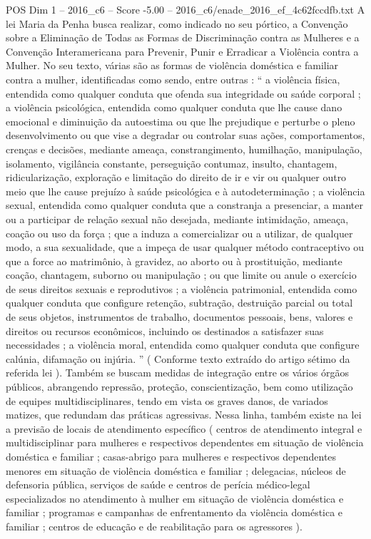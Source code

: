 \begin{textsample}{POS Dim 1 – 2016\_c6 – Score -5.00 – 2016\_c6/enade\_2016\_ef\_4c62fccdfb.txt}
A lei Maria da Penha busca realizar, como indicado no seu pórtico, a Convenção sobre a Eliminação de Todas as Formas de Discriminação contra as Mulheres e a Convenção Interamericana para Prevenir, Punir e Erradicar a Violência contra a Mulher.
No seu texto, várias são as formas de violência doméstica e familiar contra a mulher, identificadas como sendo, entre outras : “ a violência física, entendida como qualquer conduta que ofenda sua integridade ou saúde corporal ; a violência psicológica, entendida como qualquer conduta que lhe cause dano emocional e diminuição da autoestima ou que lhe prejudique e perturbe o pleno desenvolvimento ou que vise a degradar ou controlar suas ações, comportamentos, crenças e decisões, mediante ameaça, constrangimento, humilhação, manipulação, isolamento, vigilância constante, perseguição contumaz, insulto, chantagem, ridicularização, exploração e limitação do direito de ir e vir ou qualquer outro meio que lhe cause prejuízo à saúde psicológica e à autodeterminação ; a violência sexual, entendida como qualquer conduta que a constranja a presenciar, a manter ou a participar de relação sexual não desejada, mediante intimidação, ameaça, coação ou uso da força ; que a induza a comercializar ou a utilizar, de qualquer modo, a sua sexualidade, que a impeça de usar qualquer método contraceptivo ou que a force ao matrimônio, à gravidez, ao aborto ou à prostituição, mediante coação, chantagem, suborno ou manipulação ; ou que limite ou anule o exercício de seus direitos sexuais e reprodutivos ; a violência patrimonial, entendida como qualquer conduta que configure retenção, subtração, destruição parcial ou total de seus objetos, instrumentos de trabalho, documentos pessoais, bens, valores e direitos ou recursos econômicos, incluindo os destinados a satisfazer suas necessidades ; a violência moral, entendida como qualquer conduta que configure calúnia, difamação ou injúria. ” ( Conforme texto extraído do artigo sétimo da referida lei ).
Também se buscam medidas de integração entre os vários órgãos públicos, abrangendo repressão, proteção, conscientização, bem como utilização de equipes multidisciplinares, tendo em vista os graves danos, de variados matizes, que redundam das práticas agressivas.
Nessa linha, também existe na lei a previsão de locais de atendimento específico ( centros de atendimento integral e multidisciplinar para mulheres e respectivos dependentes em situação de violência doméstica e familiar ; casas-abrigo para mulheres e respectivos dependentes menores em situação de violência doméstica e familiar ; delegacias, núcleos de defensoria pública, serviços de saúde e centros de perícia médico-legal especializados no atendimento à mulher em situação de violência doméstica e familiar ; programas e campanhas de enfrentamento da violência doméstica e familiar ; centros de educação e de reabilitação para os agressores ).

\end{textsample}
